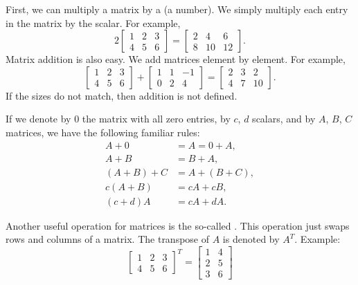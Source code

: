 \documentclass[12pt]{book}
\begin{document}
First, we can multiply a matrix by
a \emph{} (a number).
We simply multiply each entry in the matrix by the scalar.  For example,
\begin{equation*}
2
\begin{bmatrix}
1 & 2 & 3 \\
4 & 5 & 6
\end{bmatrix} =
\begin{bmatrix}
2 & 4 & 6 \\
8 & 10 & 12
\end{bmatrix} .
\end{equation*}
Matrix addition is also easy.
We add matrices element by element.
For example,
\begin{equation*}
\begin{bmatrix}
1 & 2 & 3 \\
4 & 5 & 6
\end{bmatrix} +
\begin{bmatrix}
1 & 1 & -1 \\
0 & 2 & 4
\end{bmatrix}
=
\begin{bmatrix}
2 & 3 & 2 \\
4 & 7 & 10
\end{bmatrix} .
\end{equation*}
If the sizes do not match, then addition is not defined.

If we denote by 0 the matrix with all zero entries, by
$c$, $d$ scalars, and by $A$, $B$, $C$ matrices, we
have the following familiar rules:
\begin{align*}
A + 0 & = A = 0 + A , \\
A + B & = B + A , \\
(A + B) + C & = A + (B + C) , \\
c(A+B) & = cA+cB, \\
(c+d)A & = cA + dA.
\end{align*}

Another useful operation for matrices is the so-called
\emph{}.  This operation just swaps rows and columns of a
matrix.
The transpose of $A$ is denoted by $A^T$.  Example:
\begin{equation*}
\begin{bmatrix}
1 & 2 & 3 \\
4 & 5 & 6
\end{bmatrix}^T =
\begin{bmatrix}
1 & 4 \\
2 & 5 \\
3 & 6 
\end{bmatrix}
\end{equation*}
\end{document}
